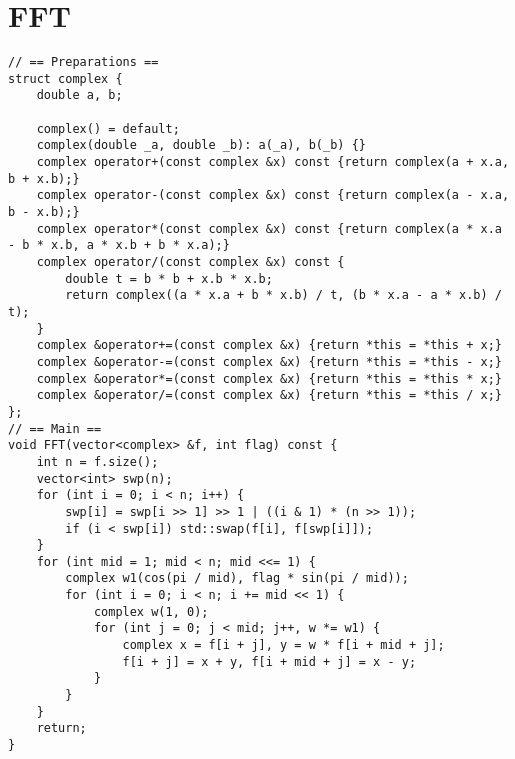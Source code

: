 \section{FFT}

\begin{verbatim}
// == Preparations ==
struct complex {
    double a, b;

    complex() = default;
    complex(double _a, double _b): a(_a), b(_b) {}
    complex operator+(const complex &x) const {return complex(a + x.a, b + x.b);}
    complex operator-(const complex &x) const {return complex(a - x.a, b - x.b);}
    complex operator*(const complex &x) const {return complex(a * x.a - b * x.b, a * x.b + b * x.a);}
    complex operator/(const complex &x) const {
        double t = b * b + x.b * x.b;
        return complex((a * x.a + b * x.b) / t, (b * x.a - a * x.b) / t);
    }
    complex &operator+=(const complex &x) {return *this = *this + x;}
    complex &operator-=(const complex &x) {return *this = *this - x;}
    complex &operator*=(const complex &x) {return *this = *this * x;}
    complex &operator/=(const complex &x) {return *this = *this / x;}
};
// == Main ==
void FFT(vector<complex> &f, int flag) const {
    int n = f.size();
    vector<int> swp(n);
    for (int i = 0; i < n; i++) {
        swp[i] = swp[i >> 1] >> 1 | ((i & 1) * (n >> 1));
        if (i < swp[i]) std::swap(f[i], f[swp[i]]);
    }
    for (int mid = 1; mid < n; mid <<= 1) {
        complex w1(cos(pi / mid), flag * sin(pi / mid));
        for (int i = 0; i < n; i += mid << 1) {
            complex w(1, 0);
            for (int j = 0; j < mid; j++, w *= w1) {
                complex x = f[i + j], y = w * f[i + mid + j];
                f[i + j] = x + y, f[i + mid + j] = x - y;
            }
        }
    }
    return;
}
\end{verbatim}